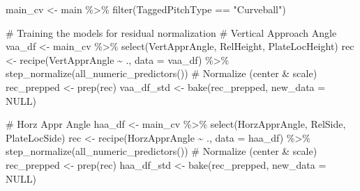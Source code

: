 \documentclass[
  letterpaper,
  DIV=11,
  numbers=noendperiod]{scrartcl}
\newenvironment{Shaded}{\begin{snugshade}}{\end{snugshade}}
\newcommand{\AttributeTok}[1]{\textcolor[rgb]{0.40,0.45,0.13}{#1}}
\newcommand{\CommentTok}[1]{\textcolor[rgb]{0.37,0.37,0.37}{#1}}
\newcommand{\ConstantTok}[1]{\textcolor[rgb]{0.56,0.35,0.01}{#1}}
\newcommand{\FunctionTok}[1]{\textcolor[rgb]{0.28,0.35,0.67}{#1}}
\newcommand{\NormalTok}[1]{\textcolor[rgb]{0.00,0.23,0.31}{#1}}
\newcommand{\OtherTok}[1]{\textcolor[rgb]{0.00,0.23,0.31}{#1}}
\newcommand{\SpecialCharTok}[1]{\textcolor[rgb]{0.37,0.37,0.37}{#1}}
\newcommand{\StringTok}[1]{\textcolor[rgb]{0.13,0.47,0.30}{#1}}
\begin{document}
\begin{Shaded}
\begin{Highlighting}[]
\NormalTok{main\_cv }\OtherTok{\textless{}{-}}\NormalTok{ main }\SpecialCharTok{\%\textgreater{}\%} 
  \FunctionTok{filter}\NormalTok{(TaggedPitchType }\SpecialCharTok{==} \StringTok{"Curveball"}\NormalTok{)}

\CommentTok{\# Training the models for residual normalization}
\CommentTok{\# Vertical Approach Angle}
\NormalTok{vaa\_df }\OtherTok{\textless{}{-}}\NormalTok{ main\_cv }\SpecialCharTok{\%\textgreater{}\%}
  \FunctionTok{select}\NormalTok{(VertApprAngle, RelHeight, PlateLocHeight)}
\NormalTok{rec }\OtherTok{\textless{}{-}} \FunctionTok{recipe}\NormalTok{(VertApprAngle }\SpecialCharTok{\textasciitilde{}}\NormalTok{ ., }\AttributeTok{data =}\NormalTok{ vaa\_df) }\SpecialCharTok{\%\textgreater{}\%}
  \FunctionTok{step\_normalize}\NormalTok{(}\FunctionTok{all\_numeric\_predictors}\NormalTok{())     }\CommentTok{\# Normalize (center \& scale)}
\NormalTok{rec\_prepped }\OtherTok{\textless{}{-}} \FunctionTok{prep}\NormalTok{(rec)}
\NormalTok{vaa\_df\_std }\OtherTok{\textless{}{-}} \FunctionTok{bake}\NormalTok{(rec\_prepped, }\AttributeTok{new\_data =} \ConstantTok{NULL}\NormalTok{)}

\CommentTok{\# Horz Appr Angle}
\NormalTok{haa\_df }\OtherTok{\textless{}{-}}\NormalTok{ main\_cv }\SpecialCharTok{\%\textgreater{}\%}
  \FunctionTok{select}\NormalTok{(HorzApprAngle, RelSide, PlateLocSide)}
\NormalTok{rec }\OtherTok{\textless{}{-}} \FunctionTok{recipe}\NormalTok{(HorzApprAngle }\SpecialCharTok{\textasciitilde{}}\NormalTok{ ., }\AttributeTok{data =}\NormalTok{ haa\_df) }\SpecialCharTok{\%\textgreater{}\%}
  \FunctionTok{step\_normalize}\NormalTok{(}\FunctionTok{all\_numeric\_predictors}\NormalTok{())     }\CommentTok{\# Normalize (center \& scale)}
\NormalTok{rec\_prepped }\OtherTok{\textless{}{-}} \FunctionTok{prep}\NormalTok{(rec)}
\NormalTok{haa\_df\_std }\OtherTok{\textless{}{-}} \FunctionTok{bake}\NormalTok{(rec\_prepped, }\AttributeTok{new\_data =} \ConstantTok{NULL}\NormalTok{)}
\end{Highlighting}
\end{Shaded}

\begin{Shaded}
\end{Shaded}
\end{document}
